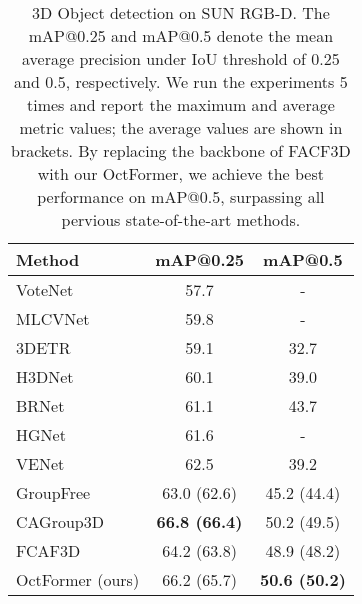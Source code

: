 \documentclass[acmtog,screen,authorversion]{acmart}
\newcommand{\tb}[1]{\textbf{#1}}
\newcommand{\tablestyle}[2]{\setlength{\tabcolsep}{#1}
                            \renewcommand{\arraystretch}{#2}
                            \centering
                            \footnotesize}
\begin{document}
\begin{table}[t]
  \centering
  \tablestyle{8pt}{1.1}
  \caption{3D Object detection on SUN RGB-D. The mAP@0.25 and mAP@0.5 denote the mean average precision under IoU threshold of 0.25 and 0.5, respectively.
  We run the experiments 5 times and report the maximum and average metric values; the average values are shown in brackets.
  By replacing the backbone of FACF3D with our OctFormer, we achieve the best performance on mAP@0.5, surpassing all pervious state-of-the-art methods.}
  \begin{tabular}{l|cc}
    \toprule
    Method                      & mAP@0.25       & mAP@0.5       \\
    \midrule
    VoteNet~\cite{Qi2019}       & 57.7           & -             \\
    MLCVNet~\cite{Xie2020a}     & 59.8           & -             \\
    3DETR~\cite{Misra2021}      & 59.1           & 32.7          \\
    H3DNet~\cite{Zhang2020a}    & 60.1           & 39.0          \\
    BRNet~\cite{Cheng2021}      & 61.1           & 43.7          \\
    HGNet~\cite{Chen2020b}      & 61.6           & -             \\
    VENet~\cite{Xie2021a}       & 62.5           & 39.2          \\
    GroupFree~\cite{Liu2021e}   & 63.0 (62.6)    & 45.2 (44.4)   \\
    CAGroup3D~\cite{Wang2022b}  & \tb{66.8 (66.4)}    & 50.2 (49.5)   \\
    \midrule
    FCAF3D~\cite{Rukhovich2022} & 64.2 (63.8)         & 48.9 (48.2)      \\
    OctFormer (ours)      & 66.2 (65.7)    & \tb{50.6 (50.2)} \\
    \bottomrule
  \end{tabular}
  \label{tab:detection}
\end{table}
 
\end{document}
